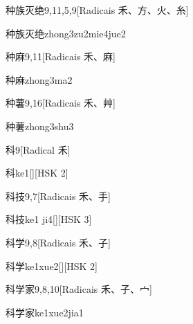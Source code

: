 \begin{entry}{种族灭绝}{9,11,5,9}[Radicais ⽲、⽅、⽕、⽷]
  \begin{phonetics}{种族灭绝}{zhong3zu2mie4jue2}
  \end{phonetics}
\end{entry}

\begin{entry}{种麻}{9,11}[Radicais ⽲、⿇]
  \begin{phonetics}{种麻}{zhong3ma2}
  \end{phonetics}
\end{entry}

\begin{entry}{种薯}{9,16}[Radicais ⽲、⾋]
  \begin{phonetics}{种薯}{zhong3shu3}
  \end{phonetics}
\end{entry}

\begin{entry}{科}{9}[Radical ⽲]
  \begin{phonetics}{科}{ke1}[][HSK 2]
  \end{phonetics}
\end{entry}

\begin{entry}{科技}{9,7}[Radicais ⽲、⼿]
  \begin{phonetics}{科技}{ke1 ji4}[][HSK 3]
  \end{phonetics}
\end{entry}

\begin{entry}{科学}{9,8}[Radicais ⽲、⼦]
  \begin{phonetics}{科学}{ke1xue2}[][HSK 2]
  \end{phonetics}
\end{entry}

\begin{entry}{科学家}{9,8,10}[Radicais ⽲、⼦、⼧]
  \begin{phonetics}{科学家}{ke1xue2jia1}
  \end{phonetics}
\end{entry}

